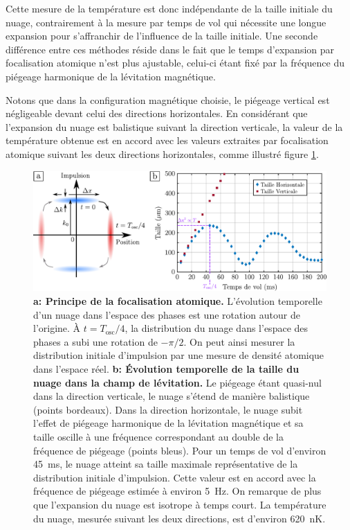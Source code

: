 Cette mesure de la température est donc indépendante de la taille initiale du nuage, contrairement à la mesure par temps de vol qui nécessite une longue expansion pour s'affranchir de l'influence de la taille initiale. Une seconde différence entre ces méthodes réside dans le fait que le temps d'expansion par focalisation atomique n'est plus ajustable, celui-ci étant fixé par la fréquence du piégeage harmonique de la lévitation magnétique. 

Notons que dans la configuration magnétique choisie, le piégeage vertical est négligeable devant celui des directions horizontales. En considérant que l'expansion du nuage est balistique suivant la direction verticale, la valeur de la température obtenue est en accord avec les valeurs extraites par focalisation atomique suivant les deux directions horizontales, comme illustré figure \ref{fig:focalisation_atomique}.

\begin{figure}
\centering
\includegraphics[width=\textwidth]{Fig/Modif_exp/focalisation_atomique.pdf}
\caption{\textbf{a: Principe de la focalisation atomique.} L'évolution temporelle d'un nuage dans l'espace des phases est une rotation autour de l'origine. À $t=T_{\mathrm{osc}}/4$, la distribution du nuage dans l'espace des phases a subi une rotation de $-\pi/2$. On peut ainsi mesurer la distribution initiale d'impulsion par une mesure de densité atomique dans l'espace réel. \textbf{b: Évolution temporelle de la taille du nuage dans la champ de lévitation.} Le piégeage étant quasi-nul dans la direction verticale, le nuage s'étend de manière balistique (points bordeaux). Dans la direction horizontale, le nuage subit l'effet de piégeage harmonique de la lévitation magnétique et sa taille oscille à une fréquence correspondant au double de la fréquence de piégeage (points bleus). Pour un temps de vol d'environ \SI{45}{\milli\second}, le nuage atteint sa taille maximale représentative de la distribution initiale d'impulsion. Cette valeur est en accord avec la fréquence de piégeage estimée à environ \SI{5}{\hertz}. On remarque de plus que l'expansion du nuage est isotrope à temps court. La température du nuage, mesurée suivant les deux directions, est d'environ \SI{620}{\nano\kelvin}.}
\label{fig:focalisation_atomique}
\end{figure}





